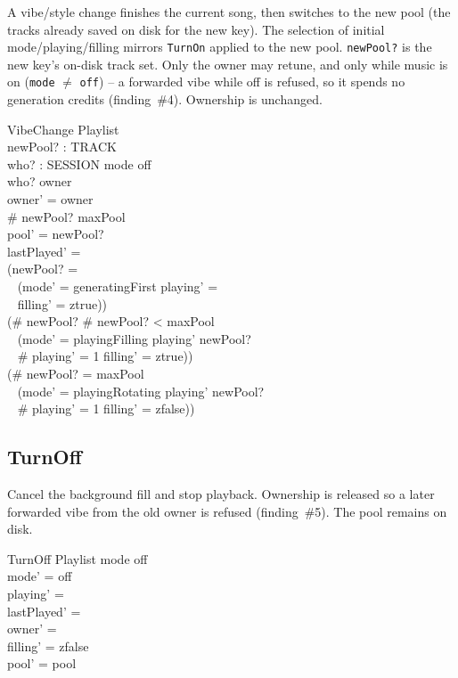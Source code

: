 \documentclass[a4paper,10pt,fleqn]{article}
\begin{document}
A vibe/style change finishes the current song, then switches to the new
pool (the tracks already saved on disk for the new key). The selection
of initial mode/playing/filling mirrors \texttt{TurnOn} applied to the
new pool. \texttt{newPool?} is the new key's on-disk track set. Only the
owner may retune, and only while music is on (\texttt{mode} $\neq$
\texttt{off}) -- a forwarded vibe while off is refused, so it spends no
generation credits (finding~\#4). Ownership is unchanged.

\begin{schema}{VibeChange}
  \Delta Playlist \\
  newPool? : \power TRACK \\
  who? : SESSION
  \where
  mode \neq off \\
  who? \in owner \\
  owner' = owner \\
  \# newPool? \leq maxPool \\
  pool' = newPool? \\
  lastPlayed' = \emptyset \\
  (newPool? = \emptyset \implies \\
    \quad~ (mode' = generatingFirst \land playing' = \emptyset \\
  \quad~ \land filling' = ztrue)) \\
  (\# newPool?  \land \# newPool? < maxPool \implies \\
    \quad~ (mode' = playingFilling \land playing' \subseteq newPool? \\
  \quad~ \land \# playing' = 1 \land filling' = ztrue)) \\
  (\# newPool? = maxPool \implies \\
    \quad~ (mode' = playingRotating \land playing' \subseteq newPool? \\
  \quad~ \land \# playing' = 1 \land filling' = zfalse))
\end{schema}

\subsection{TurnOff}

Cancel the background fill and stop playback. Ownership is released so a
later forwarded vibe from the old owner is refused (finding~\#5). The pool
remains on disk.

\begin{schema}{TurnOff}
  \Delta Playlist
  \where
  mode \neq off \\
  mode' = off \\
  playing' = \emptyset \\
  lastPlayed' = \emptyset \\
  owner' = \emptyset \\
  filling' = zfalse \\
  pool' = pool
\end{schema}
\end{document}
